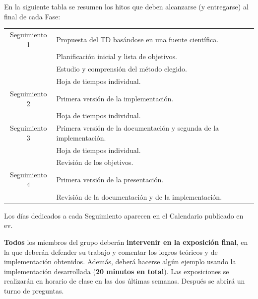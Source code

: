 \documentclass[a4paper]{article}
\begin{document}
\vspace{1cm}
En la siguiente tabla se resumen los hitos que deben alcanzarse (y entregarse) al final de cada Fase: 

    \begin{center}
    \begin{tabular}{|c||l|}
    \hline
  Seguimiento 1 & Propuesta del TD basándose en una fuente científica.   \\& Planificación inicial y lista de objetivos. \\
  & Estudio y comprensión del método elegido. \\
  & Hoja de tiempos individual.\\
\hline
Seguimiento 2  & Primera versión de la implementación. \\ &  Hoja de tiempos individual.\\
\hline
 Seguimiento 3 & Primera versión de la documentación y segunda de la implementación.\\
&  Hoja de tiempos individual.\\& Revisión de los objetivos. \\
\hline
Seguimiento 4 & Primera versión de la presentación.  \\& Revisión de la documentación  y de la  implementación.\\
\hline
    \end{tabular}
    \end{center}
Los días dedicados a cada Seguimiento aparecen en el Calendario publicado en ev.

\textbf{Todos} los miembros del grupo deberán \textbf{intervenir en la exposición final}, en la que deberán defender su trabajo y comentar los logros teóricos y de implementación obtenidos. Además, deberá hacerse algún ejemplo usando la implementación desarrollada (\textbf{20 minutos en total}). Las exposiciones se realizarán en horario de clase en las dos últimas semanas. Después se abrirá un turno de preguntas.


\end{document}
